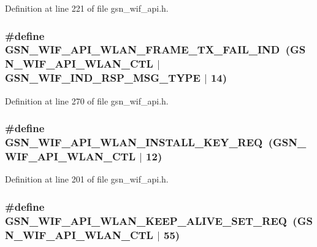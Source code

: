 Definition at line 221 of file gsn\_\-wif\_\-api.h.

\hypertarget{a00606_a9853dd8e3717d38a6e418711af6ca64b}{
\subsubsection[{GSN\_\-WIF\_\-API\_\-WLAN\_\-FRAME\_\-TX\_\-FAIL\_\-IND}]{\setlength{\rightskip}{0pt plus 5cm}\#define GSN\_\-WIF\_\-API\_\-WLAN\_\-FRAME\_\-TX\_\-FAIL\_\-IND~(GSN\_\-WIF\_\-API\_\-WLAN\_\-CTL $|$ GSN\_\-WIF\_\-IND\_\-RSP\_\-MSG\_\-TYPE $|$ 14)}}
\label{a00606_a9853dd8e3717d38a6e418711af6ca64b}


Definition at line 270 of file gsn\_\-wif\_\-api.h.

\hypertarget{a00606_a7391bce85b67103d09002373a1cd4dd4}{
\subsubsection[{GSN\_\-WIF\_\-API\_\-WLAN\_\-INSTALL\_\-KEY\_\-REQ}]{\setlength{\rightskip}{0pt plus 5cm}\#define GSN\_\-WIF\_\-API\_\-WLAN\_\-INSTALL\_\-KEY\_\-REQ~(GSN\_\-WIF\_\-API\_\-WLAN\_\-CTL $|$ 12)}}
\label{a00606_a7391bce85b67103d09002373a1cd4dd4}


Definition at line 201 of file gsn\_\-wif\_\-api.h.

\hypertarget{a00606_a8a7ad08db4f5e8b8ed8d954a4ab164b1}{
\subsubsection[{GSN\_\-WIF\_\-API\_\-WLAN\_\-KEEP\_\-ALIVE\_\-SET\_\-REQ}]{\setlength{\rightskip}{0pt plus 5cm}\#define GSN\_\-WIF\_\-API\_\-WLAN\_\-KEEP\_\-ALIVE\_\-SET\_\-REQ~(GSN\_\-WIF\_\-API\_\-WLAN\_\-CTL $|$ 55)}}
\label{a00606_a8a7ad08db4f5e8b8ed8d954a4ab164b1}



